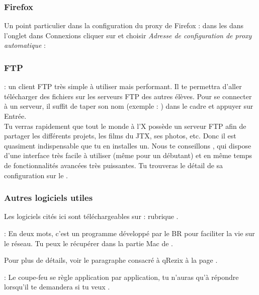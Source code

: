 \subsubsection{Firefox}
Un point particulier dans la configuration du proxy de Firefox : dans les  dans l'onglet  dans Connexions cliquer sur  et choisir \emph{Adresse de configuration de proxy automatique} : 

\subsubsection{FTP}

  : un client FTP très simple à utiliser mais performant. Il te permettra d'aller télécharger des fichiers sur les serveurs FTP des autres élèves.
Pour se connecter à un serveur, il suffit de taper son nom (exemple : ) dans le cadre  et appuyer sur Entrée.\\
Tu verras rapidement que tout le monde à l'X possède un serveur FTP afin de partager les différents projets, les films du JTX, ses photos, etc. Donc il est quasiment indispensable que tu en installes un. Nous te conseillons , qui dispose d'une interface très facile à utiliser (même pour un débutant) et en même temps de fonctionnalités avancées très puissantes. Tu trouveras le détail de sa configuration sur le .

\subsubsection{Autres logiciels utiles}

Les logiciels cités ici sont téléchargeables sur  : rubrique .

 \noindent{} : En deux mots, c'est un programme développé par le BR pour faciliter la vie sur le réseau. Tu peux le récupérer dans la partie Mac de \xshare.

\noindent Pour plus de détails, voir le paragraphe consacré à qRezix à la page \pageref{qrezix}.

\noindent {} : Le coupe-feu se règle application par application, tu n'auras qu'à répondre  lorsqu'il te demandera si tu veux .

